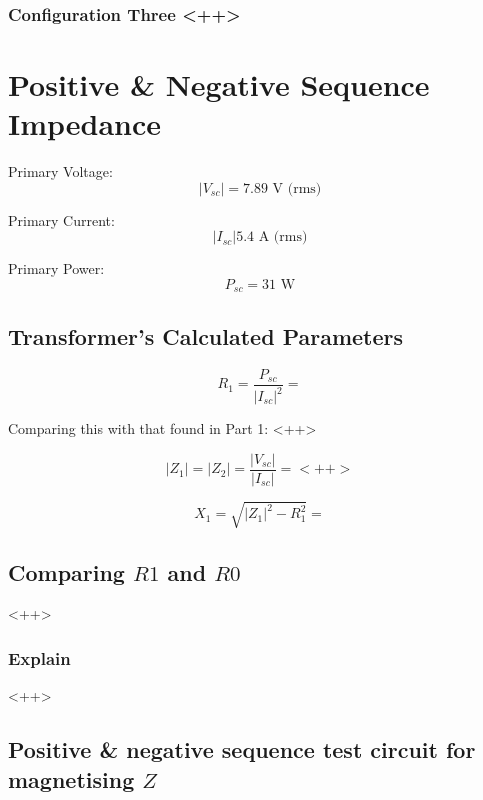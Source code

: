 \documentclass{article}
\begin{document}
\subsubsection{Configuration Three <++>} 

\section{Positive \& Negative Sequence Impedance} 

Primary Voltage:
\begin{equation}
  | V _{sc} | = 7.89 \text{ V (rms)}
\end{equation}

Primary Current:
\begin{equation}
  | I _{sc} | 5.4 \text{ A (rms)}
\end{equation}

Primary Power:
\begin{equation}
  P _{sc} = 31 \text{ W}
\end{equation}

\subsection{Transformer's Calculated Parameters} 

\begin{equation}
  R_1 = \frac{P _{sc}}{| I _{sc}|^2} = 
\end{equation}

Comparing this with that found in Part 1:
<++>

\begin{equation}
  | Z _1 | = | Z _2 | = \frac{|V_{sc}|}{|I_{sc}|} = <++>
\end{equation}

\begin{equation}
  X_1 = \sqrt{| Z _1 |^2 - R^2 _1} = 
\end{equation}

\subsection{Comparing $R1$ and $R0$} 

<++>

\subsubsection{Explain} 

<++>

\subsection{Positive \& negative sequence test circuit for magnetising $Z$ } 
\end{document}

